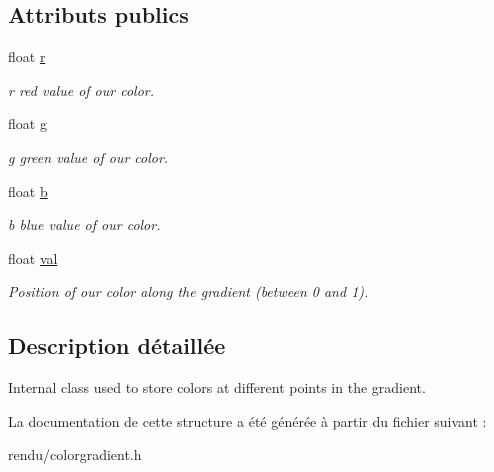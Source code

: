 \subsection*{Attributs publics}
\begin{DoxyCompactItemize}
\item 
\hypertarget{struct_color_gradient_1_1_color_point_a49bba60a0dab6e93c7d1487a2c34d96d}{}float \hyperlink{struct_color_gradient_1_1_color_point_a49bba60a0dab6e93c7d1487a2c34d96d}{r}\label{struct_color_gradient_1_1_color_point_a49bba60a0dab6e93c7d1487a2c34d96d}

\begin{DoxyCompactList}\small\item\em r red value of our color. \end{DoxyCompactList}\item 
\hypertarget{struct_color_gradient_1_1_color_point_ae319ced624675dc844843947bf76a2e0}{}float \hyperlink{struct_color_gradient_1_1_color_point_ae319ced624675dc844843947bf76a2e0}{g}\label{struct_color_gradient_1_1_color_point_ae319ced624675dc844843947bf76a2e0}

\begin{DoxyCompactList}\small\item\em g green value of our color. \end{DoxyCompactList}\item 
\hypertarget{struct_color_gradient_1_1_color_point_accc64344c40b5e53db0f0db6a5e1711d}{}float \hyperlink{struct_color_gradient_1_1_color_point_accc64344c40b5e53db0f0db6a5e1711d}{b}\label{struct_color_gradient_1_1_color_point_accc64344c40b5e53db0f0db6a5e1711d}

\begin{DoxyCompactList}\small\item\em b blue value of our color. \end{DoxyCompactList}\item 
\hypertarget{struct_color_gradient_1_1_color_point_a0e4cf76fee334f31c96182f12c44cf09}{}float \hyperlink{struct_color_gradient_1_1_color_point_a0e4cf76fee334f31c96182f12c44cf09}{val}\label{struct_color_gradient_1_1_color_point_a0e4cf76fee334f31c96182f12c44cf09}

\begin{DoxyCompactList}\small\item\em Position of our color along the gradient (between 0 and 1). \end{DoxyCompactList}\end{DoxyCompactItemize}


\subsection{Description détaillée}
Internal class used to store colors at different points in the gradient. 

La documentation de cette structure a été générée à partir du fichier suivant \+:\begin{DoxyCompactItemize}
\item 
rendu/colorgradient.\+h\end{DoxyCompactItemize}

